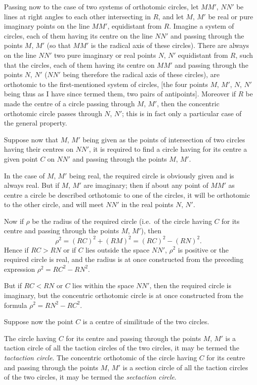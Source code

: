 \documentclass[11pt,a4paper]{book}
\begin{document}
Passing now to the case of two systems of orthotomic circles, let $MM'$, $NN'$ be lines at right angles to each other intersecting in $R$, and let $M$, $M'$ be real or pure imaginary points on the line $MM'$, equidistant from $R$. Imagine a system of circles, each of them having its centre on the line $NN'$ and passing through the points $M$, $M'$ (so that $MM'$ is the radical axis of these circles). There are always on the line $NN'$ two pure imaginary or real points $N$, $N'$ equidistant from $R$, such that the circles, each of them having its centre on $MM'$ and passing through the points $N$, $N'$ ($NN'$ being therefore the radical axis of these circles), are orthotomic to the first-mentioned system of circles, [the four points $M$, $M'$, $N$, $N'$ being thus as I have since termed them, two pairs of antipoints]. Moreover if $R$ be made the centre of a circle passing through $M$, $M'$, then the concentric orthotomic circle passes through $N$, $N'$; this is in fact only a particular case of the general property.

Suppose now that $M$, $M'$ being given as the points of intersection of two circles having their centres on $NN'$, it is required to find a circle having for its centre a given point $C$ on $NN'$ and passing through the points $M$, $M'$.

In the case of $M$, $M'$ being real, the required circle is obviously given and is always real. But if $M$, $M'$ are imaginary; then if about any point of $MM'$ as centre a circle be described orthotomic to one of the circles, it will be orthotomic to the other circle, and will meet $NN'$ in the real points $N$, $N'$.

Now if $\rho$ be the radius of the required circle (i.e.\ of the circle having $C$ for its centre and passing through the points $M$, $M'$), then
\[
\rho^2 = (RC)^2 + (RM)^2 = (RC)^2 - (RN)^2.
\]
Hence if $RC > RN$ or if $C$ lies outside the space $NN'$, $\rho^2$ is positive or the required circle is real, and the radius is at once constructed from the preceding expression $\rho^2 = RC^2 - RN^2$.

But if $RC < RN$ or $C$ lies within the space $NN'$, then the required circle is imaginary, but the concentric orthotomic circle is at once constructed from the formula $\rho^2 = RN^2 - RC^2$.

\newpage
[183]

Suppose now the point $C$ is a centre of similitude of the two circles.

The circle having $C$ for its centre and passing through the points $M$, $M'$ is a taction circle of all the taction circles of the two circles, it may be termed the \textit{tactaction circle}. The concentric orthotomic of the circle having $C$ for its centre and passing through the points $M$, $M'$ is a section circle of all the taction circles of the two circles, it may be termed the \textit{sectaction circle}.
\end{document}
